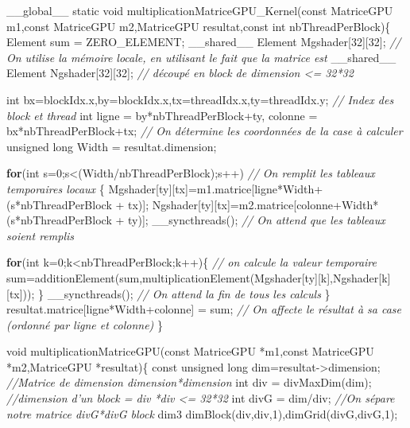 \documentclass[]{article}
\newenvironment{Shaded}{\begin{snugshade}}{\end{snugshade}}
\newcommand{\KeywordTok}[1]{\textcolor[rgb]{0.13,0.29,0.53}{\textbf{{#1}}}}
\newcommand{\DataTypeTok}[1]{\textcolor[rgb]{0.13,0.29,0.53}{{#1}}}
\newcommand{\DecValTok}[1]{\textcolor[rgb]{0.00,0.00,0.81}{{#1}}}
\newcommand{\CommentTok}[1]{\textcolor[rgb]{0.56,0.35,0.01}{\textit{{#1}}}}
\newcommand{\NormalTok}[1]{{#1}}
\begin{document}
\begin{Shaded}
\begin{Highlighting}[]
\NormalTok{__global__ }\DataTypeTok{static} \DataTypeTok{void} \NormalTok{multiplicationMatriceGPU_Kernel(}\DataTypeTok{const} \NormalTok{MatriceGPU m1,}\DataTypeTok{const} \NormalTok{MatriceGPU m2,MatriceGPU resultat,}\DataTypeTok{const} \DataTypeTok{int} \NormalTok{nbThreadPerBlock)\{}
    \NormalTok{Element sum = ZERO_ELEMENT;}
    \NormalTok{__shared__ Element Mgshader[}\DecValTok{32}\NormalTok{][}\DecValTok{32}\NormalTok{]; }\CommentTok{// On utilise la mémoire locale, en utilisant le fait que la matrice est}
    \NormalTok{__shared__ Element Ngshader[}\DecValTok{32}\NormalTok{][}\DecValTok{32}\NormalTok{]; }\CommentTok{// découpé en block de dimension <= 32*32}
    
    \DataTypeTok{int} \NormalTok{bx=blockIdx.x,by=blockIdx.x,tx=threadIdx.x,ty=threadIdx.y; }\CommentTok{// Index des block et thread}
    \DataTypeTok{int} \NormalTok{ligne = by*nbThreadPerBlock+ty, colonne = bx*nbThreadPerBlock+tx; }\CommentTok{// On détermine les coordonnées de la case à calculer}
    \DataTypeTok{unsigned} \DataTypeTok{long} \NormalTok{Width = resultat.dimension;}
    
    \KeywordTok{for}\NormalTok{(}\DataTypeTok{int} \NormalTok{s=}\DecValTok{0}\NormalTok{;s<(Width/nbThreadPerBlock);s++) }\CommentTok{// On remplit les tableaux temporaires locaux}
    \NormalTok{\{}
        \NormalTok{Mgshader[ty][tx]=m1.matrice[ligne*Width+(s*nbThreadPerBlock + tx)];}
        \NormalTok{Ngshader[ty][tx]=m2.matrice[colonne+Width*(s*nbThreadPerBlock + ty)];}
        \NormalTok{__syncthreads(); }\CommentTok{// On attend que les tableaux soient remplis}
        
        \KeywordTok{for}\NormalTok{(}\DataTypeTok{int} \NormalTok{k=}\DecValTok{0}\NormalTok{;k<nbThreadPerBlock;k++)\{ }\CommentTok{// on calcule la valeur temporaire}
            \NormalTok{sum=additionElement(sum,multiplicationElement(Mgshader[ty][k],Ngshader[k][tx]));}
        \NormalTok{\}}
        \NormalTok{__syncthreads(); }\CommentTok{// On attend la fin de tous les calculs}
    \NormalTok{\}}
    \NormalTok{resultat.matrice[ligne*Width+colonne] = sum; }\CommentTok{// On affecte le résultat à sa case (ordonné par ligne et colonne)}
\NormalTok{\}}

\DataTypeTok{void} \NormalTok{multiplicationMatriceGPU(}\DataTypeTok{const} \NormalTok{MatriceGPU *m1,}\DataTypeTok{const} \NormalTok{MatriceGPU *m2,MatriceGPU *resultat)\{}
    \DataTypeTok{const} \DataTypeTok{unsigned} \DataTypeTok{long} \NormalTok{dim=resultat->dimension; }\CommentTok{//Matrice de dimension dimension*dimension}
    \DataTypeTok{int} \NormalTok{div = divMaxDim(dim); }\CommentTok{//dimension d'un block = div *div <= 32*32}
    \DataTypeTok{int} \NormalTok{divG = dim/div; }\CommentTok{//On sépare notre matrice  divG*divG block}
    \NormalTok{dim3 dimBlock(div,div,}\DecValTok{1}\NormalTok{),dimGrid(divG,divG,}\DecValTok{1}\NormalTok{);}
    

\end{Highlighting}
\end{Shaded}
\end{document}
